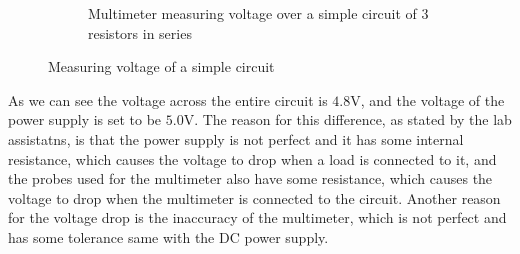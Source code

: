 \documentclass[a4paper, 10pt]{article}
\begin{document}
\begin{figure}[h]
\begin{subfigure}[h]{0.65\textwidth}
							\caption{Multimeter measuring voltage over a simple circuit of 3 resistors in series}
							\label{sub-fig:MeasuringVoltageOfASimpleCircuit}
						\end{subfigure}

						\caption{Measuring voltage of a simple circuit}
						\label{fig:MeasuringVoltageOfACircuit}
				\end{figure}

				As we can see the voltage across the entire circuit is $4.8\text{V}$, and the voltage of the power supply is set to be $5.0\text{V}$. The reason for this difference, as stated by the
				lab assistatns, is that the power supply is not perfect and it has some internal resistance, which causes the voltage to drop when a load is connected to it, and the 
				probes used for the multimeter also have some resistance, which causes the voltage to drop when the multimeter is connected to the circuit. Another reason for the voltage drop is the
				inaccuracy of the multimeter, which is not perfect and has some tolerance same with the DC power supply.
\end{document}
